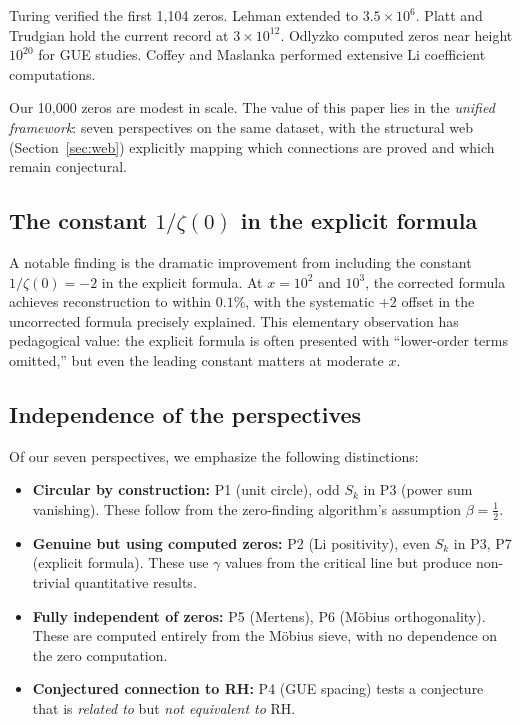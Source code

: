 \documentclass[11pt,a4paper]{article}
\theoremstyle{definition}
\begin{document}
Turing \cite{Turing1953} verified the first 1{,}104 zeros. Lehman \cite{Lehman1970} extended to $3.5 \times 10^6$. Platt and Trudgian \cite{PlattTrudgian2021} hold the current record at $3 \times 10^{12}$. Odlyzko \cite{Odlyzko2001} computed zeros near height $10^{20}$ for GUE studies. Coffey \cite{Coffey2005} and Maslanka \cite{Maslanka2004} performed extensive Li coefficient computations.

Our 10{,}000 zeros are modest in scale. The value of this paper lies in the \emph{unified framework}: seven perspectives on the same dataset, with the structural web (Section~\ref{sec:web}) explicitly mapping which connections are proved and which remain conjectural.

\subsection{The constant $1/\zeta(0)$ in the explicit formula}

A notable finding is the dramatic improvement from including the constant $1/\zeta(0) = -2$ in the explicit formula. At $x = 10^2$ and $10^3$, the corrected formula achieves reconstruction to within $0.1\%$, with the systematic $+2$ offset in the uncorrected formula precisely explained. This elementary observation has pedagogical value: the explicit formula is often presented with ``lower-order terms omitted,'' but even the leading constant matters at moderate $x$.

\subsection{Independence of the perspectives}

Of our seven perspectives, we emphasize the following distinctions:
\begin{itemize}
  \item \textbf{Circular by construction:} P1 (unit circle), odd $S_k$ in P3 (power sum vanishing). These follow from the zero-finding algorithm's assumption $\beta = \tfrac{1}{2}$.
  \item \textbf{Genuine but using computed zeros:} P2 (Li positivity), even $S_k$ in P3, P7 (explicit formula). These use $\gamma$ values from the critical line but produce non-trivial quantitative results.
  \item \textbf{Fully independent of zeros:} P5 (Mertens), P6 (M\"obius orthogonality). These are computed entirely from the M\"obius sieve, with no dependence on the zero computation.
  \item \textbf{Conjectured connection to RH:} P4 (GUE spacing) tests a conjecture that is \emph{related to} but \emph{not equivalent to} RH.
\end{itemize}
\end{document}
